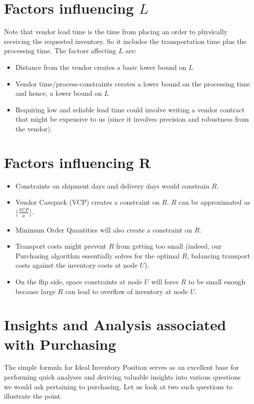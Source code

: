 \documentclass[11pt]{amsart}
\begin{document}
\section{Factors influencing $L$}
Note that vendor lead time is the time from placing an order to physically receiving the requested inventory. So it includes the transportation time plus the processing time. The factors affecting $L$ are:
\begin{itemize}
\item Distance from the vendor creates a basic lower bound on $L$
\item Vendor time/process-constraints creates a lower bound on the processing time and hence, a lower bound on $L$
\item Requiring low and reliable lead time could involve writing a vendor contract that might be expensive to us (since it involves precision and robustness from the vendor).
\end{itemize}

\section{Factors influencing R}
\begin{itemize}
\item Constraints on shipment days and delivery days would constrain $R$.
\item Vendor Casepack (VCP) creates a constraint on $R$. $R$ can be approximated as $\lfloor \frac {VCP} {\mu} \rfloor$.
\item Minimum Order Quantities will also create a constraint on $R$.
\item Transport costs might prevent $R$ from getting too small (indeed, our Purchasing algorithm essentially solves for the optimal $R$, balancing transport costs against the inventory costs at node $U$).
\item On the flip side, space constraints at node $U$ will force $R$ to be small enough because large $R$ can lead to overflow of inventory at node $U$.
\end{itemize}

\section{Insights and Analysis associated with Purchasing}

The simple formula for Ideal Inventory Position serves as an excellent base for performing quick analyses and deriving valuable insights into various questions we would ask pertaining to purchasing. Let us look at two such questions to illustrate the point.
\end{document}
